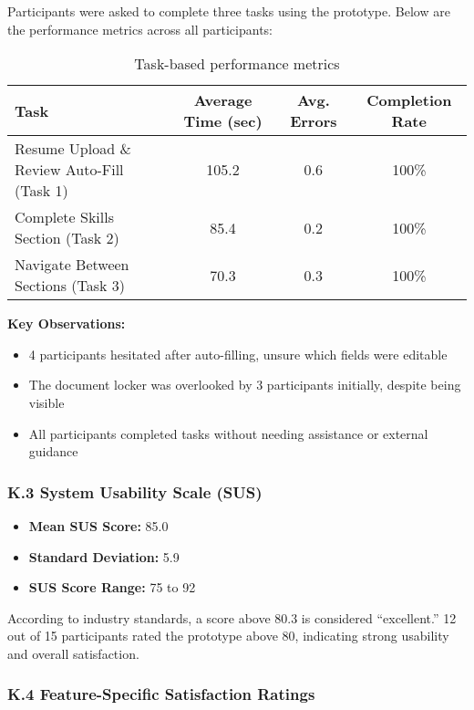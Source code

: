 \documentclass[
	letterpaper, %
]{jdf}
\begin{document}
\begin{sloppypar}
Participants were asked to complete three tasks using the prototype. Below are the performance metrics across all participants:

\begin{table}[h]
\centering
\begin{tabular}{|l|c|c|c|}
\hline
\textbf{Task} & \textbf{Average Time (sec)} & \textbf{Avg. Errors} & \textbf{Completion Rate} \\
\hline
Resume Upload \& Review Auto-Fill (Task 1) & 105.2 & 0.6 & 100\% \\
Complete Skills Section (Task 2) & 85.4 & 0.2 & 100\% \\
Navigate Between Sections (Task 3) & 70.3 & 0.3 & 100\% \\
\hline
\end{tabular}
\caption{Task-based performance metrics}
\end{table}

\textbf{Key Observations:}
\begin{itemize}
    \item 4 participants hesitated after auto-filling, unsure which fields were editable
    \item The document locker was overlooked by 3 participants initially, despite being visible
    \item All participants completed tasks without needing assistance or external guidance
\end{itemize}

\subsubsection{K.3 System Usability Scale (SUS)}

\begin{itemize}
    \item \textbf{Mean SUS Score:} 85.0
    \item \textbf{Standard Deviation:} 5.9
    \item \textbf{SUS Score Range:} 75 to 92
\end{itemize}

According to industry standards, a score above 80.3 is considered “excellent.” 12 out of 15 participants rated the prototype above 80, indicating strong usability and overall satisfaction.

\subsubsection{K.4 Feature-Specific Satisfaction Ratings}


\end{sloppypar}
\end{document}
